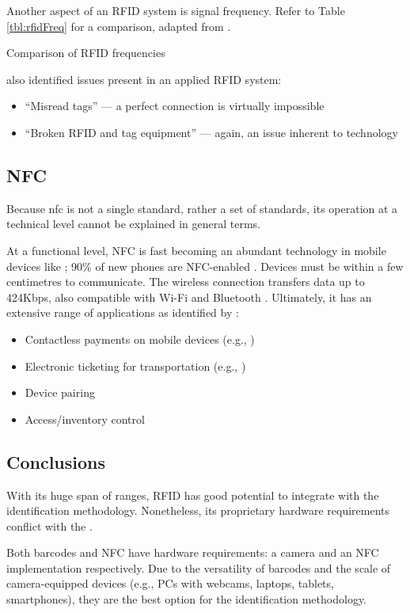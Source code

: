 Another aspect of an RFID system is signal frequency.
Refer to Table \ref{tbl:rfidFreq} for a comparison, adapted
from \cite{whatIsRfid}.

\begin{table}[ht]
  \centering
  
  \caption{Comparison of RFID frequencies}
  \label{tbl:rfidFreq}
\end{table}

\cite{barcodeRfidComparison} also identified issues present
in an applied RFID system:

\begin{itemize}

  \item \enquote{Misread tags} --- a perfect
        connection is virtually impossible

  \item \enquote{Broken RFID and tag equipment}
        --- again, an issue inherent to technology

\end{itemize}

\subsection{NFC} \label{ss:nfc}

Because \gls{nfc} is not a single standard, rather a set of
standards, its operation at a technical level cannot be
explained in general terms.


At a functional level, NFC is fast becoming an abundant
technology in mobile devices like
; 90\% of new phones
are NFC-enabled \parencite{nfcHandsetStats}. Devices must be
within a few centimetres to communicate. The wireless
connection transfers data up to 424Kbps, also compatible 
with Wi-Fi and Bluetooth \parencite{nfc}. Ultimately, it has
an extensive range of applications as identified by 
\cite{nfc}: 

\begin{itemize}
  \item Contactless payments on mobile devices
        (e.g., \cite{androidPayWithPhone, applePay})
  \item Electronic ticketing for transportation
        (e.g., \cite{digitalTickets})
  \item Device pairing
  \item Access/inventory control
\end{itemize}

\subsection{Conclusions}

With its huge span of ranges, RFID has good potential to
integrate with the identification methodology. Nonetheless,
its proprietary hardware requirements conflict with the 
. 

Both barcodes and NFC have hardware requirements: a camera
and an NFC implementation respectively. Due to the
versatility of barcodes and the scale of camera-equipped
devices (e.g., PCs with webcams, laptops, tablets,
smartphones), they are the best option for the 
identification methodology.
